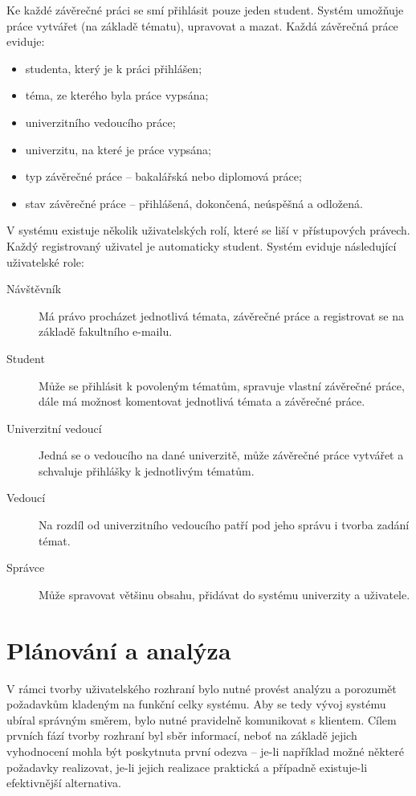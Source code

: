 Ke každé závěrečné práci se smí přihlásit pouze jeden student. Systém umožňuje práce vytvářet (na základě tématu), upravovat a mazat. Každá závěrečná práce eviduje:

\begin{itemize}
    \item studenta, který je k práci přihlášen;
    \item téma, ze kterého byla práce vypsána;
    \item univerzitního vedoucího práce;
    \item univerzitu, na které je práce vypsána;
    \item typ závěrečné práce -- bakalářská nebo diplomová práce;
    \item stav závěrečné práce -- přihlášená, dokončená, neúspěšná a odložená.
\end{itemize}

V systému existuje několik uživatelských rolí, které se liší v přístupových právech. Každý registrovaný uživatel je automaticky student. Systém eviduje následující uživatelské role:

\begin{description}
    \item[Návštěvník] Má právo procházet jednotlivá témata, závěrečné práce a registrovat se na základě fakultního e-mailu.
    \item[Student] Může se přihlásit k povoleným tématům, spravuje vlastní závěrečné práce, dále má možnost komentovat jednotlivá témata a závěrečné práce.
    \item[Univerzitní vedoucí] Jedná se o vedoucího na dané univerzitě, může závěrečné práce vytvářet a schvaluje přihlášky k jednotlivým tématům.
    \item[Vedoucí] Na rozdíl od univerzitního vedoucího patří pod jeho správu i tvorba zadání témat.
    \item[Správce] Může spravovat většinu obsahu, přidávat do systému univerzity a uživatele.
\end{description}

\section{Plánování a analýza}

V rámci tvorby uživatelského rozhraní bylo nutné provést analýzu a porozumět požadavkům kladeným na funkční celky systému. Aby se tedy vývoj systému ubíral správným směrem, bylo nutné pravidelně komunikovat s klientem. Cílem prvních fází tvorby rozhraní byl sběr informací, neboť na základě jejich vyhodnocení mohla být poskytnuta první odezva -- je-li například možné některé požadavky realizovat, je-li jejich realizace praktická a případně existuje-li efektivnější alternativa.

